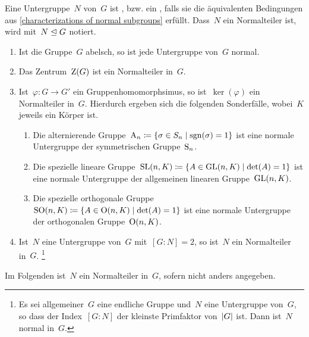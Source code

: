\begin{definition}
  Eine Untergruppe~$N$ von~$G$ ist , bzw. ein , falls sie die äquivalenten Bedingungen aus \cref{characterizations of normal subgroups} erfüllt.
  Dass~$N$ ein Normalteiler ist, wird mit~$N \trianglelefteq G$ notiert.
\end{definition}

\begin{example}
  \leavevmode
  \begin{enumerate}
    \item
      Ist die Gruppe~$G$ abelsch, so ist jede Untergruppe von~$G$ normal.
    \item
      Das Zentrum~$\operatorname{Z}(G)$ ist ein Normalteiler in~$G$.
    \item
      Ist~$\varphi \colon G \to G'$ ein Gruppenhomomorphsimus, so ist~$\ker(\varphi)$ ein Normalteiler in~$G$.
      Hierdurch ergeben sich die folgenden Sonderfälle, wobei~$K$ jeweils ein Körper ist.
      \begin{enumerate}
        \item
          Die alternierende Gruppe~$\Alt_n \defined \{ \sigma \in S_n \suchthat \sgn(\sigma) = 1 \}$ ist eine normale Untergruppe der symmetrischen Gruppe~$\operatorname{S}_n$.
        \item
          Die spezielle lineare Gruppe~$\SL(n,K) \defined \{ A \in \GL(n,K) \suchthat \det(A) = 1 \}$ ist eine normale Untergruppe der allgemeinen linearen Gruppe~$\operatorname{GL}(n,K)$.
        \item
          Die spezielle orthogonale Gruppe~$\SOrth(n,K) \defined \{ A \in \Orth(n,K) \suchthat \det(A) = 1 \}$ ist eine normale Untergruppe der orthogonalen Gruppe~$\operatorname{O}(n,K)$.
      \end{enumerate}
    \item
      Ist~$N$ eine Untergruppe von~$G$ mit~$[G : N] = 2$, so ist~$N$ ein Normalteiler in~$G$.%
      \footnote{
        Es sei allgemeiner~$G$ eine endliche Gruppe und~$N$ eine Untergruppe von~$G$, so dass der Index~$[G : N]$ der kleinste Primfaktor von~$\lvert G\rvert$ ist.
        Dann ist~$N$ normal in~$G$.
      }
  \end{enumerate}
\end{example}

\begin{convention}
  Im Folgenden ist~$N$ ein Normalteiler in~$G$, sofern nicht anders angegeben.
\end{convention}




